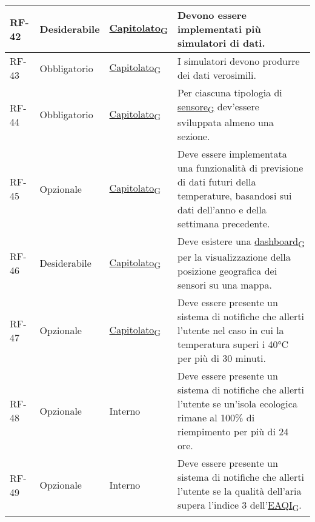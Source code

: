 \begin{longtable}{|>{\centering\arraybackslash}m{}|>{\centering\arraybackslash}m{}|>{\centering\arraybackslash}m{}|>{\centering\arraybackslash}m{}|}
	RF-42           & Desiderabile        & \href{https://7last.github.io/docs/pb/documentazione-interna/glossario\#capitolato}{Capitolato\textsubscript{G}} & Devono essere implementati più simulatori di dati.
	\\\hline
	RF-43           & Obbligatorio        & \href{https://7last.github.io/docs/pb/documentazione-interna/glossario\#capitolato}{Capitolato\textsubscript{G}} & I simulatori devono produrre dei dati verosimili.
	\\\hline
	RF-44           & Obbligatorio        & \href{https://7last.github.io/docs/pb/documentazione-interna/glossario\#capitolato}{Capitolato\textsubscript{G}} & Per ciascuna tipologia di \href{https://7last.github.io/docs/pb/documentazione-interna/glossario\#sensore}{sensore\textsubscript{G}} dev'essere sviluppata almeno una sezione.
	\\\hline
	RF-45           & Opzionale           & \href{https://7last.github.io/docs/pb/documentazione-interna/glossario\#capitolato}{Capitolato\textsubscript{G}} & Deve essere implementata una funzionalità di previsione di dati futuri della temperature, basandosi sui dati dell'anno e della settimana precedente.
	\\\hline
	RF-46           & Desiderabile        & \href{https://7last.github.io/docs/pb/documentazione-interna/glossario\#capitolato}{Capitolato\textsubscript{G}} & Deve esistere una \href{https://7last.github.io/docs/pb/documentazione-interna/glossario\#dashboard}{dashboard\textsubscript{G}} per la visualizzazione della posizione geografica dei sensori su una mappa.
	\\\hline
	RF-47           & Opzionale           & \href{https://7last.github.io/docs/pb/documentazione-interna/glossario\#capitolato}{Capitolato\textsubscript{G}} & Deve essere presente un sistema di notifiche che allerti l'utente nel caso in cui la temperatura superi i 40°C per più di 30 minuti.
	\\\hline
	RF-48           & Opzionale           & Interno                                                                                                           & Deve essere presente un sistema di notifiche che allerti l'utente se un'isola ecologica rimane al 100\% di riempimento per più di 24 ore.
	\\\hline
	RF-49           & Opzionale           & Interno                                                                                                           & Deve essere presente un sistema di notifiche che allerti l'utente se la qualità dell'aria supera l'indice 3 dell'\href{https://7last.github.io/docs/pb/documentazione-interna/glossario\#european-air-quality-index}{EAQI\textsubscript{G}}.

\end{longtable}
